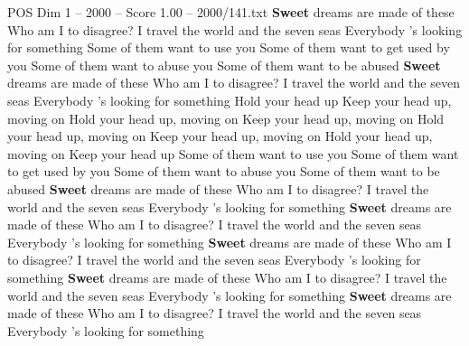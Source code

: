 \begin{textsample}{POS Dim 1 – 2000 – Score 1.00 – 2000/141.txt}  \label{ex:f1_pos_032}
\textbf{Sweet} dreams are made of these Who am I to disagree?
I travel the world and the seven seas Everybody 's looking for something Some of them want to use you Some of them want to get used by you Some of them want to abuse you Some of them want to be abused \textbf{Sweet} dreams are made of these Who am I to disagree?
I travel the world and the seven seas Everybody 's looking for something Hold your head up Keep your head up, moving on Hold your head up, moving on Keep your head up, moving on Hold your head up, moving on Keep your head up, moving on Hold your head up, moving on Keep your head up Some of them want to use you Some of them want to get used by you Some of them want to abuse you Some of them want to be abused \textbf{Sweet} dreams are made of these Who am I to disagree?
I travel the world and the seven seas Everybody 's looking for something \textbf{Sweet} dreams are made of these Who am I to disagree?
I travel the world and the seven seas Everybody 's looking for something \textbf{Sweet} dreams are made of these Who am I to disagree?
I travel the world and the seven seas Everybody 's looking for something \textbf{Sweet} dreams are made of these Who am I to disagree?
I travel the world and the seven seas Everybody 's looking for something \textbf{Sweet} dreams are made of these Who am I to disagree?
I travel the world and the seven seas Everybody 's looking for something

\end{textsample}
